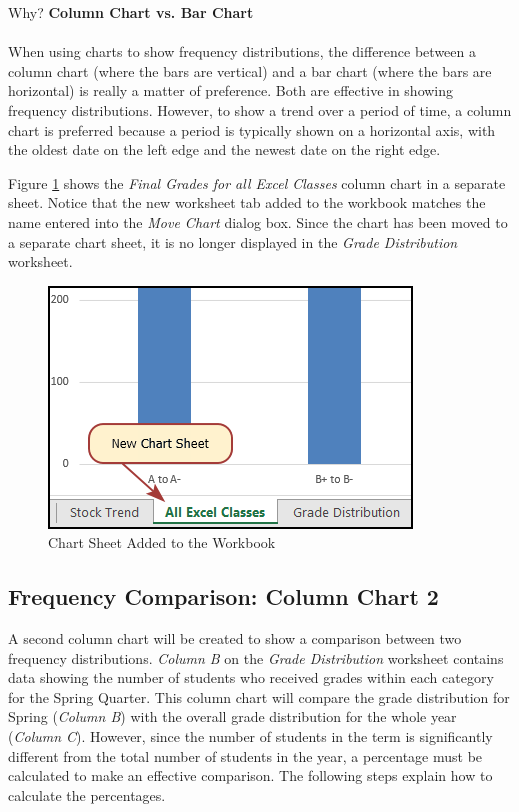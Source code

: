 \begin{center}
	\begin{infobox}{Why?}
		\textbf{Column Chart vs. Bar Chart}
		\\
		\\
		When using charts to show frequency distributions, the difference between a column chart (where the bars are vertical) and a bar chart (where the bars are horizontal) is really a matter of preference. Both are effective in showing frequency distributions. However, to show a trend over a period of time, a column chart is preferred because a period is typically shown on a horizontal axis, with the oldest date on the left edge and the newest date on the right edge.
	\end{infobox}
\end{center}

Figure \ref{04:fig16} shows the \textit{Final Grades for all Excel Classes} column chart in a separate sheet. Notice that the new worksheet tab added to the workbook matches the name entered into the \textit{Move Chart} dialog box. Since the chart has been moved to a separate chart sheet, it is no longer displayed in the \textit{Grade Distribution} worksheet.

\begin{figure}[H]
	\centering
	\includegraphics[width=\maxwidth{.65\linewidth}]{gfx/ch04_fig16}
	\caption{Chart Sheet Added to the Workbook}
	\label{04:fig16}
\end{figure}

\subsection{Frequency Comparison: Column Chart 2}

A second column chart will be created to show a comparison between two frequency distributions. \textit{Column B} on the \textit{Grade Distribution} worksheet contains data showing the number of students who received grades within each category for the Spring Quarter. This column chart will compare the grade distribution for Spring (\textit{Column B}) with the overall grade distribution for the whole year (\textit{Column C}). However, since the number of students in the term is significantly different from the total number of students in the year, a percentage must be calculated to make an effective comparison. The following steps explain how to calculate the percentages.

